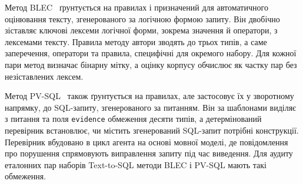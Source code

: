 \documentclass[a4paper,14pt,oneside]{extreport}
\begin{document}
Метод BLEC~\cite{shu2021blec} ґрунтується на правилах і призначений для автоматичного оцінювання тексту, згенерованого за логічною формою запиту. Він двобічно зіставляє ключові лексеми логічної форми, зокрема значення й оператори, з лексемами тексту. Правила методу автори зводять до трьох типів, а саме заперечення, оператори та правила, специфічні для окремого набору. Для кожної пари метод визначає бінарну мітку, а оцінку корпусу обчислює як частку пар без незіставлених лексем.

Метод PV-SQL~\cite{tian2026pvsql} також ґрунтується на правилах, але застосовує їх у зворотному напрямку, до SQL-запиту, згенерованого за питанням. Він за шаблонами виділяє з питання та поля \texttt{evidence} обмеження десяти типів, а детермінований перевірник встановлює, чи містить згенерований SQL-запит потрібні конструкції. Перевірник вбудовано в цикл агента на основі мовної моделі, де повідомлення про порушення спрямовують виправлення запиту під час виведення. Для аудиту еталонних пар наборів Text-to-SQL методи BLEC і PV-SQL мають такі обмеження.
\end{document}
